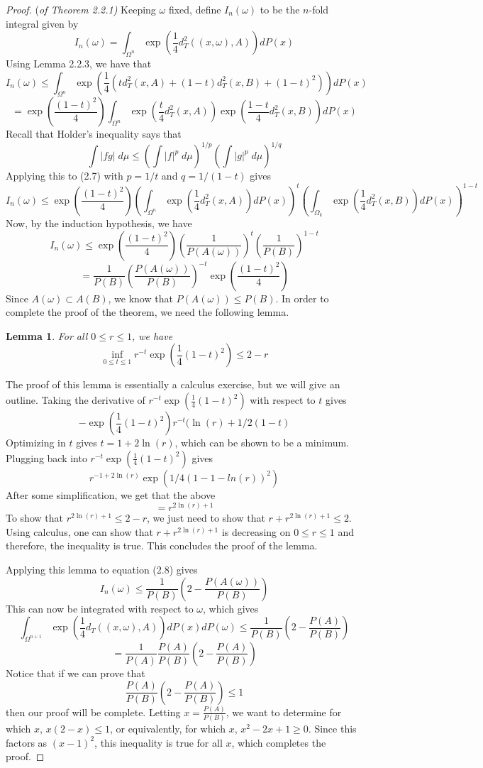 \documentclass[12pt]{report}
\newtheorem{lem}[thm]{Lemma}
\newcommand{\be}{\begin{equation}}
\newcommand{\ee}{\end{equation}}
\theoremstyle{definition}
\begin{document}
\begin{proof}{(\em of Theorem 2.2.1)}
Keeping $\omega$ fixed, define $I_n(\omega)$ to be the $n$-fold integral given by 
$$
I_n(\omega)=\int_{\Omega^n}\exp\left(\frac{1}{4} d_T^2((x,\omega),A)\right)dP(x)
$$
Using Lemma 2.2.3, we have that 
$$
I_n(\omega)\leq \int_{\Omega^n}\exp\left(\frac{1}{4}(t d_T^2(x,A)+(1-t)d_T^2(x,B)+(1-t)^2)\right)dP(x)
$$
\be
=\exp\left(\frac{(1-t)^2}{4}\right) \int_{\Omega^n}\exp\left(\frac{t}{4}d_T^2(x,A)\right)\exp\left(\frac{1-t}{4} d_T^2(x,B)\right) dP(x)
\ee
Recall that Holder's inequality says that 
$$
\int |fg| \; d\mu\leq \left(\int |f|^p\;d\mu\right)^{1/p}\left(\int|g|^p\;d\mu\right)^{1/q}
$$
Applying this to (2.7) with $p=1/t$ and $q=1/(1-t)$ gives 
$$
I_n(\omega)\leq \exp\left(\frac{(1-t)^2}{4}\right)\left(\int_{\Omega^n}\exp\left(\frac{1}{4}d_T^2(x,A)\right)dP(x)\right)^t\left(\int_{\Omega_k}\exp\left(\frac{1}{4}d_T^2(x,B)\right)dP(x)\right)^{1-t}
$$
Now, by the induction hypothesis, we have 
$$
I_n(\omega)\leq \exp\left(\frac{(1-t)^2}{4}\right)\left(\frac{1}{P(A(\omega))}\right)^t\left(\frac{1}{P(B)}\right)^{1-t}
$$
\be
=\frac{1}{P(B)}\left(\frac{P(A(\omega))}{P(B)}\right)^{-t}\exp\left(\frac{(1-t)^2}{4}\right)
\ee
Since $A(\omega)\subset A(B)$, we know that 
$P(A(\omega))\leq P(B)$.  In order to complete the proof of the theorem, we need the following lemma.
\begin{lem}
For all $0\leq r\leq 1$, we have 
$$
\inf_{0\leq t\leq 1}r^{-t}\exp\left(\frac{1}{4}(1-t)^2\right)\leq 2-r
$$
\end{lem}
The proof of this lemma is essentially a calculus exercise, but we will give an outline.  Taking the derivative of $r^{-t}\exp\left(\frac{1}{4}(1-t)^2\right)$ with respect to $t$ gives 
$$
-\exp \left(\frac{1}{4}(1-t)^2\right)r^{-t}(\ln(r)+1/2(1-t)
$$
Optimizing in $t$ gives $t=1+2\ln(r)$, which can be shown to be a minimum.  Plugging back into $r^{-t}\exp\left(\frac{1}{4}(1-t)^2\right)$ gives 
$$
r^{-1+2\ln(r)}\exp(1/4(1-1-ln(r))^2)
$$
After some simplification, we get that the above
$$
=r^{2\ln(r)+1}
$$
To show that $r^{2\ln(r)+1}\leq 2-r$, we just need to show that $r+r^{2\ln(r)+1}\leq 2$.  Using calculus, one can show that $r+r^{2\ln(r)+1}$ is decreasing on $0\leq r\leq 1$ and therefore, the inequality is true.  This concludes the proof of the lemma.

Applying this lemma to equation (2.8) gives 
$$
I_n(\omega)\leq \frac{1}{P(B)}\left(2-\frac{P(A(\omega))}{P(B)}\right)
$$
This can now be integrated with respect to $\omega$, which gives 
$$
\int_{\Omega^{n+1}}\exp\left(\frac{1}{4}d_T((x,\omega),A)\right)dP(x)dP(\omega)\leq\frac{1}{P(B)}\left(2-\frac{P(A)}{P(B)}\right)
$$
$$
=\frac{1}{P(A)}\frac{P(A)}{P(B)}\left(2-\frac{P(A)}{P(B)}\right)
$$
Notice that if we can prove that 
$$
\frac{P(A)}{P(B)}\left(2-\frac{P(A)}{P(B)}\right)\leq 1
$$
then our proof will be complete.  Letting $x=\frac{P(A)}{P(B)}$, we want to determine for which $x$, $x(2-x)\leq 1$, or equivalently, for which $x$, $x^2-2x+1\geq 0$.  Since this factors as $(x-1)^2$, this inequality is true for all $x$, which completes the proof.  
\end{proof}
\end{document}
